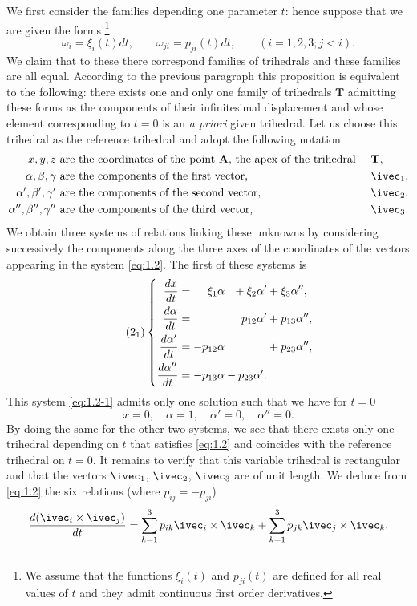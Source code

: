 We first consider the families depending one parameter $t$: hence suppose that we are given the forms \footnote{We assume that the functions $\xi_{i}(t)$ and $p_{ji}(t)$ are defined for all real values of $t$ and they admit continuous first order derivatives.}
\[
\omega_{i}=\xi_{i}(t)dt,\qquad
\omega_{ji}=p_{ji}(t)dt,\qquad
(i=1,2,3;j<i).
\]
We claim that to these there correspond families of trihedrals and these families are all equal. According to the previous paragraph this proposition is equivalent to the following: there exists one and only one family of trihedrals $\mathbf{T}$ admitting these forms as the components of their infinitesimal displacement and whose element corresponding to $t=0$ is an \emph{a priori} given trihedral. Let us choose this trihedral as the reference trihedral and adopt the following notation
\begin{alignat*}{3}
  x,y,z&\text{ are the coordinates of the point $\mathbf{A}$, the apex of the trihedral }&&\mathbf{T},\\
  \alpha,\beta,\gamma&\text{ are the components of the first vector, }&&\ivec_{1},\\
  \alpha',\beta',\gamma'&\text{ are the components of the second vector, }&&\ivec_{2},\\
  \alpha'',\beta'',\gamma''&\text{ are the components of the third vector, }&&\ivec_{3}.
\end{alignat*}
We obtain three systems of relations linking these unknowns by considering successively the components along the three axes of the coordinates of the vectors appearing in the system \eqref{eq:1.2}. The first of these systems is
\begin{equation}
  \label{eq:1.2-1}\tag{2$_{1}$}
  \left\{
    \begin{alignedat}{4}
      \frac{dx}{dt}&={}&\xi_{1}\alpha&&{}+\xi_{2}\alpha'&+\xi_{3}\alpha'',\\
      \frac{d\alpha}{dt}&={}&&&p_{12}\alpha'&+p_{13}\alpha'',\\
      \frac{d\alpha'}{dt}&={}&-p_{12}\alpha&&&+p_{23}\alpha'',\\
      \frac{d\alpha''}{dt}&={}&-p_{13}\alpha&&{}-p_{23}\alpha'.&
    \end{alignedat}
  \right.
\end{equation}
This system \eqref{eq:1.2-1} admits only one solution such that we have for $t=0$
\[
x=0,\quad\alpha=1,\quad\alpha'=0,\quad\alpha''=0.
\]
By doing the same for the other two systems, we see that there exists only one trihedral depending on $t$ that satisfies \eqref{eq:1.2} and coincides with the reference trihedral on $t=0$. It remains to verify that this variable trihedral is rectangular and that the vectors $\ivec_{1}$, $\ivec_{2}$, $\ivec_{3}$ are of unit length. We deduce from \eqref{eq:1.2} the six relations (where $p_{ij}=-p_{ji}$)
\[
\frac{d(\ivec_{i}\times\ivec_{j})}{dt}=\sum_{k=1}^{3} p_{ik}\ivec_{i}\times\ivec_{k}+\sum_{k=1}^{3}p_{jk}\ivec_{j}\times\ivec_{k}.
\]

